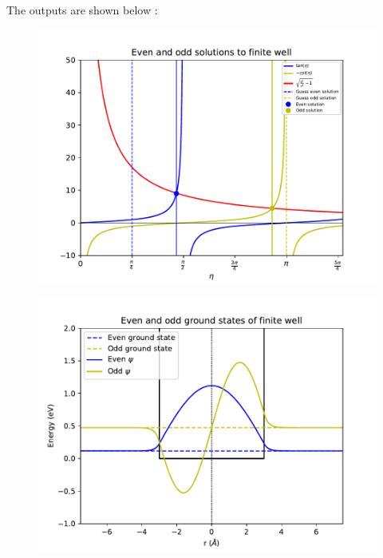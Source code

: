 \documentclass[a4paper,10pt]{article}
\begin{document}
The outputs are shown below :



\begin{figure}[H]
\centering
\includegraphics[scale=0.9]{transcendental_sol.pdf} 
\end{figure}

\begin{figure}[H]
\centering
\includegraphics[scale=0.9]{wavefunction_plot_zoomed.pdf} 
\end{figure}
\end{document}
